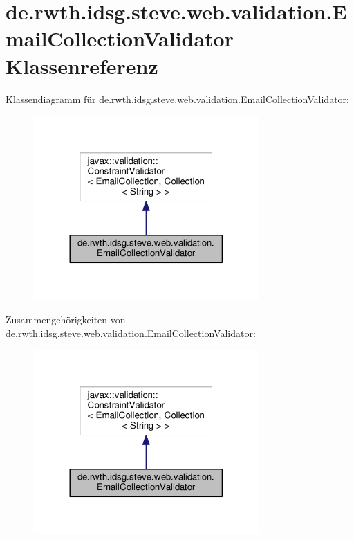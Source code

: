 \hypertarget{classde_1_1rwth_1_1idsg_1_1steve_1_1web_1_1validation_1_1_email_collection_validator}{\section{de.\+rwth.\+idsg.\+steve.\+web.\+validation.\+Email\+Collection\+Validator Klassenreferenz}
\label{classde_1_1rwth_1_1idsg_1_1steve_1_1web_1_1validation_1_1_email_collection_validator}
}


Klassendiagramm für de.\+rwth.\+idsg.\+steve.\+web.\+validation.\+Email\+Collection\+Validator\+:\nopagebreak
\begin{figure}[H]
\begin{center}
\leavevmode
\includegraphics[width=245pt]{classde_1_1rwth_1_1idsg_1_1steve_1_1web_1_1validation_1_1_email_collection_validator__inherit__graph}
\end{center}
\end{figure}


Zusammengehörigkeiten von de.\+rwth.\+idsg.\+steve.\+web.\+validation.\+Email\+Collection\+Validator\+:\nopagebreak
\begin{figure}[H]
\begin{center}
\leavevmode
\includegraphics[width=245pt]{classde_1_1rwth_1_1idsg_1_1steve_1_1web_1_1validation_1_1_email_collection_validator__coll__graph}
\end{center}
\end{figure}
